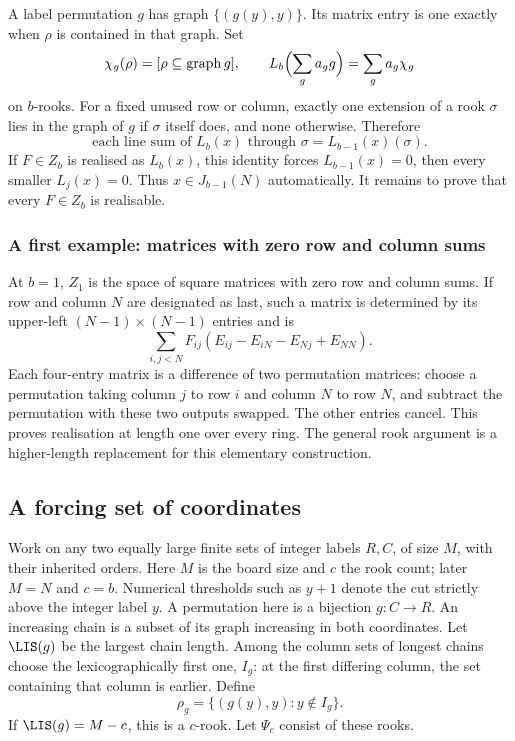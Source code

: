 A label permutation $g$ has graph $\{(g(y),y)\}$. Its matrix entry is one exactly when $\rho$ is contained in that graph. Set
\[\chi_g(\rho)=[\rho\subseteq\operatorname{graph}g],\qquad
L_b\Bigl(\sum_ga_gg\Bigr)=\sum_ga_g\chi_g
\]
on $b$-rooks. For a fixed unused row or column, exactly one extension of a rook $\sigma$ lies in the graph of $g$ if $\sigma$ itself does, and none otherwise. Therefore
\begin{equation}\label{eq:lines}
\text{each line sum of }L_b(x)\text{ through }\sigma=L_{b-1}(x)(\sigma).
\end{equation}
If $F\in Z_b$ is realised as $L_b(x)$, this identity forces $L_{b-1}(x)=0$, then every smaller $L_j(x)=0$. Thus $x\in J_{b-1}(N)$ automatically. It remains to prove that every $F\in Z_b$ is realisable.

\subsubsection{A first example: matrices with zero row and column sums}
At $b=1$, $Z_1$ is the space of square matrices with zero row and column sums. If row and column $N$ are designated as last, such a matrix is determined by its upper-left $(N-1)\times(N-1)$ entries and is
\[\sum_{i,j<N}F_{ij}(E_{ij}-E_{iN}-E_{Nj}+E_{NN}).
\]
Each four-entry matrix is a difference of two permutation matrices: choose a permutation taking column $j$ to row $i$ and column $N$ to row $N$, and subtract the permutation with these two outputs swapped. The other entries cancel. This proves realisation at length one over every ring. The general rook argument is a higher-length replacement for this elementary construction.

\subsection{A forcing set of coordinates}\label{sec:forcing}
Work on any two equally large finite sets of integer labels $R,C$,
of size $M$, with their inherited orders. Here $M$ is the board size
and $c$ the rook count; later $M=N$ and $c=b$. Numerical thresholds such as
$y+1$ denote the cut strictly above the integer label $y$. A permutation here is a bijection $g:C\to R$. An increasing chain is a subset of its graph increasing in both coordinates. Let $\LIS(g)$ be the largest chain length. Among the column sets of longest chains choose the lexicographically first one, $I_g$: at the first differing column, the set containing that column is earlier. Define
\[\rho_g=\{(g(y),y):y\notin I_g\}.
\]
If $\LIS(g)=M-c$, this is a $c$-rook. Let $\Psi_c$ consist of these rooks.

